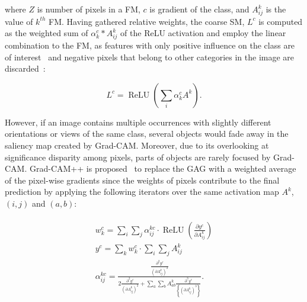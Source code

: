 where $Z$ is number of pixels in a FM, $c$ is gradient of the class, and $A_{ij}^k$ is the value of $k^{th}$ FM. Having gathered relative weights, the coarse SM, $L^c$ is computed as the weighted sum of $\alpha_k^c*A_{ij}^k$ of the ReLU activation and employ the linear combination to the FM, as features with only positive influence on the class are of interest~\cite{chattopadhay2018grad} and negative pixels that belong to other categories in the image are discarded~\cite{114}:

\vspace{-2mm}
\begin{equation}
    L^c=\operatorname{ReLU}(\sum_{i}\alpha_k^cA^k).
    \label{3.11}
\end{equation}
\vspace{-2mm}

\hspace*{3.5mm} However, if an image contains multiple occurrences with slightly different orientations or views of the same class, several objects would fade away in the saliency map created by Grad-CAM. Moreover, due to its overlooking at significance disparity among pixels, parts of objects are rarely focused by Grad-CAM. Grad-CAM++ is proposed~\cite{chattopadhay2018grad} to replace the GAG with a weighted average of the pixel-wise gradients since the weights of pixels contribute to the final prediction by applying the following iterators over the same activation map $A^k$, $(i,j)$ and $(a,b)$:

\vspace{-2mm}
\begin{align}
    \begin{aligned}
        w_{k}^{c}=\sum_{i} \sum_{j} \alpha_{i j}^{k c} \cdot \operatorname{ReLU}\left(\frac{\partial y^{c}}{\partial A_{i j}^{k}}\right) \\
        y^{c}=\sum_{k} w_{k}^{c} \cdot \sum_{i} \sum_{j} A_{i j}^{k} \\
        \alpha_{i j}^{k c}=\frac{\frac{\partial^{2} y^{\ell}}{\left(\partial A_{i j}^{k}\right)^{2}}}{2 \frac{\partial^{2} y^{c}}{\left(\partial A_{i j}^{k}\right)^{2}}+\sum_{a} \sum_{b} A_{a b}^{k} \frac{\partial^{3} y^{c}}{\left\{\left(\partial A_{i j}^{k}\right)^{3}\right\}}}.
    \end{aligned}
\end{align}

